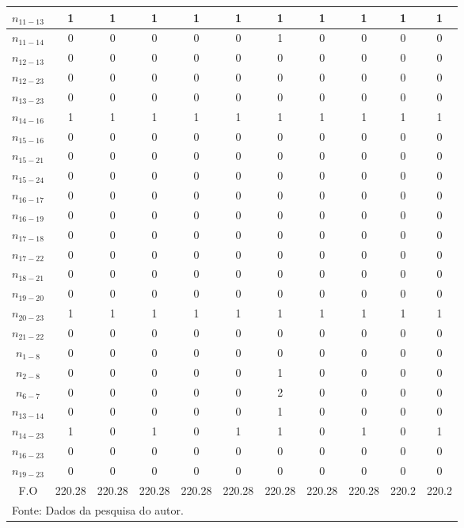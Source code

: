 \begin{centering}
\begin{longtable}{c|c|c|c|c|c|c|c|c|c|c}
\hline 
$n_{11-13}$  & 1 & 1 & 1 & 1 & 1 & 1 & 1 & 1 & 1 & 1\tabularnewline
\hline 
$n_{11-14}$  & 0 & 0 & 0 & 0 & 0 & 1 & 0 & 0 & 0 & 0\tabularnewline
\hline 
$n_{12-13}$  & 0 & 0 & 0 & 0 & 0 & 0 & 0 & 0 & 0 & 0\tabularnewline
\hline 
$n_{12-23}$  & 0 & 0 & 0 & 0 & 0 & 0 & 0 & 0 & 0 & 0\tabularnewline
\hline 
$n_{13-23}$  & 0 & 0 & 0 & 0 & 0 & 0 & 0 & 0 & 0 & 0\tabularnewline
\hline 
$n_{14-16}$  & 1 & 1 & 1 & 1 & 1 & 1 & 1 & 1 & 1 & 1\tabularnewline
\hline 
$n_{15-16}$  & 0 & 0 & 0 & 0 & 0 & 0 & 0 & 0 & 0 & 0\tabularnewline
\hline 
$n_{15-21}$  & 0 & 0 & 0 & 0 & 0 & 0 & 0 & 0 & 0 & 0\tabularnewline
\hline 
$n_{15-24}$  & 0 & 0 & 0 & 0 & 0 & 0 & 0 & 0 & 0 & 0\tabularnewline
\hline 
$n_{16-17}$  & 0 & 0 & 0 & 0 & 0 & 0 & 0 & 0 & 0 & 0\tabularnewline
\hline 
$n_{16-19}$  & 0 & 0 & 0 & 0 & 0 & 0 & 0 & 0 & 0 & 0\tabularnewline
\hline 
$n_{17-18}$  & 0 & 0 & 0 & 0 & 0 & 0 & 0 & 0 & 0 & 0\tabularnewline
\hline 
$n_{17-22}$  & 0 & 0 & 0 & 0 & 0 & 0 & 0 & 0 & 0 & 0\tabularnewline
\hline 
$n_{18-21}$  & 0 & 0 & 0 & 0 & 0 & 0 & 0 & 0 & 0 & 0\tabularnewline
\hline 
$n_{19-20}$  & 0 & 0 & 0 & 0 & 0 & 0 & 0 & 0 & 0 & 0\tabularnewline
\hline 
$n_{20-23}$  & 1 & 1 & 1 & 1 & 1 & 1 & 1 & 1 & 1 & 1\tabularnewline
\hline 
$n_{21-22}$  & 0 & 0 & 0 & 0 & 0 & 0 & 0 & 0 & 0 & 0\tabularnewline
\hline 
$n_{1-8}$  & 0 & 0 & 0 & 0 & 0 & 0 & 0 & 0 & 0 & 0\tabularnewline
\hline 
$n_{2-8}$  & 0 & 0 & 0 & 0 & 0 & 1 & 0 & 0 & 0 & 0\tabularnewline
\hline 
$n_{6-7}$  & 0 & 0 & 0 & 0 & 0 & 2 & 0 & 0 & 0 & 0\tabularnewline
\hline 
$n_{13-14}$  & 0 & 0 & 0 & 0 & 0 & 1 & 0 & 0 & 0 & 0\tabularnewline
\hline 
$n_{14-23}$  & 1 & 0 & 1 & 0 & 1 & 1 & 0 & 1 & 0 & 1\tabularnewline
\hline 
$n_{16-23}$  & 0 & 0 & 0 & 0 & 0 & 0 & 0 & 0 & 0 & 0\tabularnewline
\hline 
$n_{19-23}$  & 0 & 0 & 0 & 0 & 0 & 0 & 0 & 0 & 0 & 0\tabularnewline
\hline 
\hline 
F.O & 220.28 & 220.28 & 220.28 & 220.28 & 220.28 & 220.28 & 220.28 & 220.28 & 220.2 & 220.2\tabularnewline
\hline
\hline
\multicolumn{11}{l}{\small{Fonte: Dados da pesquisa do autor.}}\tabularnewline
\end{longtable}
\par\end{centering}


